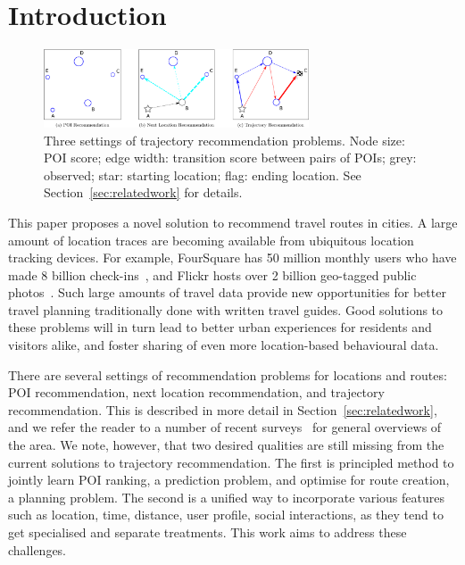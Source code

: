 
\section{Introduction}
\label{sec:intro}

\begin{figure}[ht]
	\centering
	\includegraphics[width=0.7\textwidth]{fig/fig1-flavours.pdf}
	\caption{Three settings of trajectory recommendation problems.
Node size: POI score; edge width: transition score between pairs of POIs; 
grey: observed;
star: starting location; flag: ending location. See Section~\ref{sec:relatedwork} for details.
}
	\label{fig:threesettings}
\end{figure}


This paper proposes a novel solution to recommend travel routes in cities.
A large amount of location traces are becoming available from ubiquitous location tracking devices.
For example, FourSquare
has 50 million monthly users who have made 8 billion check-ins~\cite{4sq},
and Flickr
hosts over 2 billion geo-tagged public photos~\cite{flickr}. 
Such large amounts of travel data provide new opportunities for better
travel planning traditionally done with written travel guides.
Good solutions to these problems will in turn lead to better urban experiences for residents and visitors alike, and foster sharing of even more location-based behavioural data.

There are several settings of recommendation problems for locations and routes: POI recommendation,
next location recommendation, and trajectory recommendation. This is described in more detail in
Section~\ref{sec:relatedwork}, and we refer the reader to a number of recent
surveys~\cite{bao2015recommendations,zheng2015trajectory,zheng2014urban}
for general overviews of the area. %
We note, however, that two desired qualities are still 
missing from the current solutions to trajectory recommendation. 
The first is principled method to jointly learn POI ranking, a prediction problem, 
and optimise for route creation, a planning problem. 
The second is a unified way to incorporate various features 
such as location, time, distance, user profile, social interactions, 
as they tend to get specialised and separate treatments. 
This work aims to address these challenges. %

